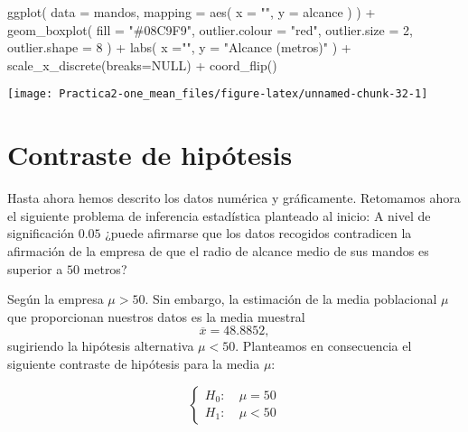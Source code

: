 \documentclass[
  degree=mecinf,
  title=normal,
  toc=normal,
  bib=normal]{mnye}
\newenvironment{Shaded}{\begin{snugshade}}{\end{snugshade}}
\newcommand{\AttributeTok}[1]{\textcolor[rgb]{0.77,0.63,0.00}{#1}}
\newcommand{\ConstantTok}[1]{\textcolor[rgb]{0.00,0.00,0.00}{#1}}
\newcommand{\DecValTok}[1]{\textcolor[rgb]{0.00,0.00,0.81}{#1}}
\newcommand{\FunctionTok}[1]{\textcolor[rgb]{0.00,0.00,0.00}{#1}}
\newcommand{\NormalTok}[1]{#1}
\newcommand{\SpecialCharTok}[1]{\textcolor[rgb]{0.00,0.00,0.00}{#1}}
\newcommand{\StringTok}[1]{\textcolor[rgb]{0.31,0.60,0.02}{#1}}
\begin{document}
\begin{Shaded}
\begin{Highlighting}[]
\FunctionTok{ggplot}\NormalTok{(}
    \AttributeTok{data =}\NormalTok{ mandos,}
    \AttributeTok{mapping =} \FunctionTok{aes}\NormalTok{(}
        \AttributeTok{x =} \StringTok{""}\NormalTok{,}
        \AttributeTok{y =}\NormalTok{ alcance}
\NormalTok{    )}
\NormalTok{) }\SpecialCharTok{+}
\FunctionTok{geom\_boxplot}\NormalTok{(}
  \AttributeTok{fill =} \StringTok{"\#08C9F9"}\NormalTok{,}
  \AttributeTok{outlier.colour =} \StringTok{"red"}\NormalTok{,}
  \AttributeTok{outlier.size =} \DecValTok{2}\NormalTok{,}
  \AttributeTok{outlier.shape =} \DecValTok{8}
\NormalTok{) }\SpecialCharTok{+}
\FunctionTok{labs}\NormalTok{(}
  \AttributeTok{x =}\StringTok{""}\NormalTok{, }
  \AttributeTok{y =} \StringTok{"Alcance (metros)"}
\NormalTok{) }\SpecialCharTok{+}
\FunctionTok{scale\_x\_discrete}\NormalTok{(}\AttributeTok{breaks=}\ConstantTok{NULL}\NormalTok{) }\SpecialCharTok{+}
\FunctionTok{coord\_flip}\NormalTok{()  }
\end{Highlighting}
\end{Shaded}

\begin{center}\texttt{[image: Practica2-one\_mean\_files/figure-latex/unnamed-chunk-32-1]} \end{center}

\hypertarget{contraste-de-hipuxf3tesis}{%
\section{Contraste de hipótesis}\label{contraste-de-hipuxf3tesis}}

Hasta ahora hemos descrito los datos numérica y gráficamente.
Retomamos ahora el siguiente problema de inferencia estadística planteado al inicio: A nivel de significación \(0.05\) ¿puede afirmarse que los datos recogidos contradicen la afirmación de la empresa de que el radio de alcance medio de sus mandos es superior a \(50\) metros?

Según la empresa \(\mu>50\). Sin embargo, la estimación de la media poblacional \(\mu\) que proporcionan nuestros
datos es la media muestral
\[\overline{x}=48.8852,\] sugiriendo la hipótesis alternativa \(\mu < 50\). Planteamos en consecuencia el siguiente contraste de hipótesis para la media \(\mu\):

\[
  \left\{
    \begin{array}{lc}
    H_0:\ & \mu= 50\\
    H_1:\ & \mu <50
    \end{array}
    \right.
\]
\end{document}
